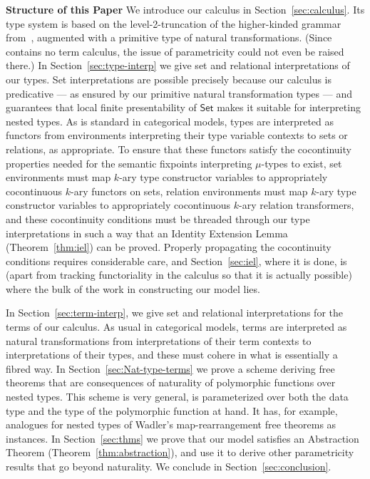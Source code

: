\documentclass[runningheads]{llncs}
\newcommand{\set}{\mathsf{Set}}
\begin{document}
\noindent
{\bf Structure of this Paper}\/ We introduce our calculus in
Section~\ref{sec:calculus}.  Its type system is based on the
level-2-truncation of the higher-kinded grammar from~\cite{jp19},
augmented with a primitive type of natural
transformations. (Since~\cite{jp19} contains no term calculus, the
issue of parametricity could not even be raised there.)  In
Section~\ref{sec:type-interp} we give set and relational
interpretations of our types. Set interpretations are possible
precisely because our calculus is predicative --- as ensured by our
primitive natural transformation types --- and~\cite{jp19} guarantees
that local finite presentability of $\set$ makes it suitable for
interpreting nested types.  As is standard in categorical models,
types are interpreted as functors from environments interpreting their
type variable contexts to sets or relations, as appropriate. To ensure
that these functors satisfy the cocontinuity properties needed for the
semantic fixpoints interpreting $\mu$-types to exist, set environments
must map $k$-ary type constructor variables to appropriately
cocontinuous $k$-ary functors on sets, relation environments must map
$k$-ary type constructor variables to appropriately cocontinuous
$k$-ary relation transformers, and these cocontinuity conditions must
be threaded through our type interpretations in such a way that an
Identity Extension Lemma (Theorem~\ref{thm:iel}) can be
proved. Properly propagating the cocontinuity conditions requires
considerable care, and Section~\ref{sec:iel}, where it is done, is
(apart from tracking functoriality in the calculus so that it is
actually possible) where the bulk of the work in constructing our
model lies.

In Section~\ref{sec:term-interp}, we give set and relational
interpretations for the terms of our calculus. As usual in categorical
models, terms are interpreted as natural transformations from
interpretations of their term contexts to interpretations of their
types, and these must cohere in what is essentially a fibred
way.
In Section~\ref{sec:Nat-type-terms} we prove
a scheme deriving free theorems that are consequences of naturality of
polymorphic functions over nested types. This scheme is very general,
is parameterized over both the data type and the type of the
polymorphic function at hand. It has, for example, analogues for
nested types of Wadler's map-rearrangement free theorems as
instances. In Section~\ref{sec:thms} we prove that our model satisfies
an Abstraction Theorem (Theorem~\ref{thm:abstraction}), and use it to
derive other parametricity results that go beyond naturality. We
conclude in Section~\ref{sec:conclusion}.
\end{document}
